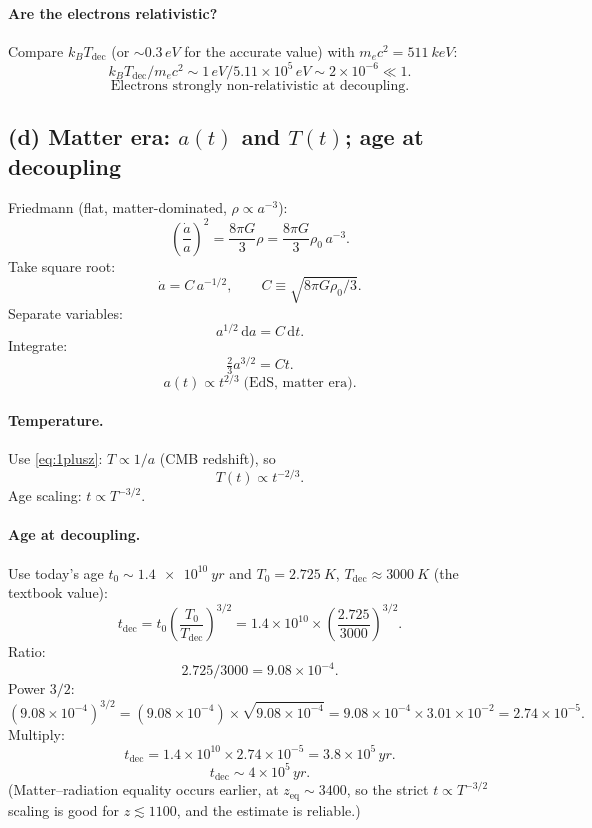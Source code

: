 \documentclass[11pt]{article}
\newcommand{\de}{\mathrm{d}}
\begin{document}
\paragraph{Are the electrons relativistic?}
Compare $k_B T_\text{dec}$ (or $\sim 0.3\,\si{eV}$ for the accurate value) with $m_e c^2 = \SI{511}{keV}$:
\[
k_B T_\text{dec}/m_e c^2 \sim 1\,\si{eV}/5.11\times 10^5\,\si{eV}\sim 2\times 10^{-6}\ll 1.
\]
\[
\boxed{\;\text{Electrons strongly non-relativistic at decoupling.}\;}
\]

\subsection*{(d) Matter era: $a(t)$ and $T(t)$; age at decoupling}

Friedmann (flat, matter-dominated, $\rho\propto a^{-3}$):
\[
\!\left(\frac{\dot a}{a}\right)^{\!2} = \frac{8\pi G}{3}\rho = \frac{8\pi G}{3}\rho_0\,a^{-3}.
\]
Take square root:
\[
\dot a = C\,a^{-1/2},\qquad C\equiv\sqrt{8\pi G\rho_0/3}.
\]
Separate variables:
\[
a^{1/2}\,\de a = C\,\de t.
\]
Integrate:
\[
\tfrac{2}{3}a^{3/2} = C t.
\]
\[
\boxed{\;a(t)\propto t^{2/3}\;\text{(EdS, matter era).}\;}
\]

\paragraph{Temperature.}
Use \eqref{eq:1plusz}: $T\propto 1/a$ (CMB redshift), so
\[
T(t)\propto t^{-2/3}.
\]
Age scaling: $t\propto T^{-3/2}$.

\paragraph{Age at decoupling.}
Use today's age $t_0\sim\SI{1.4e10}{yr}$ and $T_0 = \SI{2.725}{K}$, $T_\text{dec}\approx \SI{3000}{K}$ (the textbook value):
\[
t_\text{dec} = t_0\!\left(\frac{T_0}{T_\text{dec}}\right)^{\!3/2} = 1.4\times 10^{10}\times\!\left(\frac{2.725}{3000}\right)^{\!3/2}.
\]
Ratio:
\[
2.725/3000 = 9.08\times 10^{-4}.
\]
Power $3/2$:
\[
(9.08\times 10^{-4})^{3/2} = (9.08\times 10^{-4})\times\sqrt{9.08\times 10^{-4}} = 9.08\times 10^{-4}\times 3.01\times 10^{-2} = 2.74\times 10^{-5}.
\]
Multiply:
\[
t_\text{dec} = 1.4\times 10^{10}\times 2.74\times 10^{-5} = 3.8\times 10^{5}\,\si{yr}.
\]
\[
\boxed{\;t_\text{dec}\sim 4\times 10^{5}\,\si{yr}.\;}
\]
(Matter--radiation equality occurs earlier, at $z_\text{eq}\sim 3400$, so the strict $t\propto T^{-3/2}$ scaling is good for $z\lesssim 1100$, and the estimate is reliable.)
\end{document}
